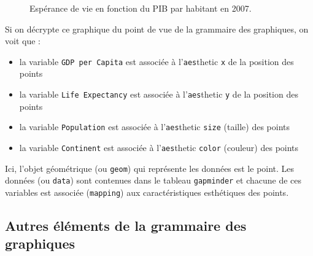 \documentclass[
  a4paper,
  DIV=11,
  numbers=noendperiod,
  oneside]{scrreprt}
\providecommand{\tightlist}{%
  \setlength{\itemsep}{0pt}\setlength{\parskip}{0pt}}\usepackage{longtable,booktabs,array}
\begin{document}
\begin{figure}


\caption{\label{fig-gapminder}Espérance de vie en fonction du PIB par
habitant en 2007.}

\end{figure}%

Si on décrypte ce graphique du point de vue de la grammaire des
graphiques, on voit que :

\begin{itemize}
\tightlist
\item
  la variable \texttt{GDP\ per\ Capita} est associée à
  l'\texttt{aes}thetic \texttt{x} de la position des points
\item
  la variable \texttt{Life\ Expectancy} est associée à
  l'\texttt{aes}thetic \texttt{y} de la position des points
\item
  la variable \texttt{Population} est associée à l'\texttt{aes}thetic
  \texttt{size} (taille) des points
\item
  la variable \texttt{Continent} est associée à l'\texttt{aes}thetic
  \texttt{color} (couleur) des points
\end{itemize}

Ici, l'objet géométrique (ou \texttt{geom}) qui représente les données
est le point. Les données (ou \texttt{data}) sont contenues dans le
tableau \texttt{gapminder} et chacune de ces variables est associée
(\texttt{mapping}) aux caractéristiques esthétiques des points.

\subsection{Autres éléments de la grammaire des
graphiques}\label{autres-uxe9luxe9ments-de-la-grammaire-des-graphiques}
\end{document}
